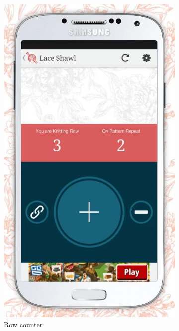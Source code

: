 \begin{figure}[H]
  \centering
    \begin{subfigure}[b]{0.4\textwidth}
      \centering
        \includegraphics[width=0.95\linewidth]{images/image10.png}
        \caption[Row counter ]{Row counter}
      \label{fig:knit_tink_row_counter}
    \end{subfigure}
    \begin{subfigure}[b]{0.4\textwidth}

\end{subfigure}
\end{figure}
